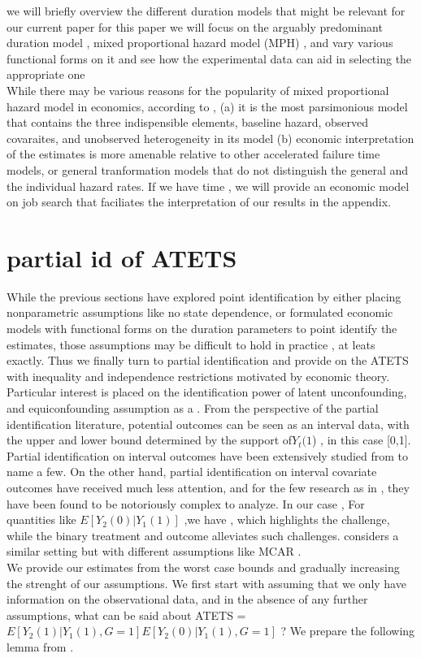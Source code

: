 \documentclass{article}
\begin{document}
we will briefly overview the different duration models that might be relevant for our current paper
for this paper we will focus on the arguably predominant duration model , mixed proportional hazard model (MPH) , and vary various functional forms on it and see how the experimental data can aid in selecting the appropriate one\\
While there may be various reasons for the popularity of mixed proportional hazard model in economics, according to \cite{van derberg 2003, abbring and vanderberg 2002, heckman and singer 1981}, (a) it is the most parsimonious model that contains the three indispensible elements, baseline hazard, observed covaraites, and unobserved heterogeneity in its model (b) economic interpretation of the estimates is more amenable relative to other accelerated failure time models, or general tranformation models that do not distinguish the general and the individual hazard rates.
If we have time , we will provide an economic model on job search that faciliates the interpretation of our results in the appendix.


\section{partial id of ATETS}
 While the previous sections have explored point identification by either placing nonparametric assumptions like no state dependence, or formulated economic models with functional forms on the duration parameters to point identify the estimates, those assumptions may be difficult to hold in practice , at leats exactly. Thus we finally turn to partial identification and provide  on the ATETS with inequality and independence restrictions motivated by economic theory. Particular interest is placed on the identification power of latent unconfounding, and equiconfounding assumption as a .
 From the perspective of the partial identification literature, potential outcomes can be seen as an interval data, with the upper and lower bound determined by the support of$ Y_t(1$) , in this case [0,1]. Partial identification on interval outcomes have been extensively studied from \cite{manski 2003, manski and tamer 2002} to name a few. On the other hand, partial identification on interval covariate outcomes have received much less attention, and for the few research as in \cite{berst molinari 2008}, they have been found to be notoriously complex to analyze. In our case , For quantities like $E[ Y _2(0) | Y_1(1) ]$ ,we have , which highlights the challenge, while the  binary treatment and outcome alleviates such challenges. \cite{manski and horowitz 2000} considers a similar setting but with different assumptions like MCAR .\\
We provide our estimates from the worst case bounds and gradually increasing the strenght of our assumptions.  We first start with assuming that we only have information on the observational data, and in the absence of any further assumptions, what can be said about ATETS = $E[ Y_2(1) | Y_1(1) , G =1 ]  E[ Y_2(0) | Y_1(1), G =1]$ ? We prepare the following lemma from \cite{manski and horowitz 2000} .
\end{document}
